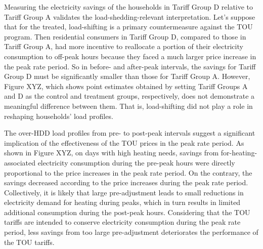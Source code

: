 Measuring the electricity savings of the households in Tariff Group D relative to Tariff Group A validates the load-shedding-relevant interpretation. Let's suppose that for the treated, load-shifting is a primary countermeasure against the TOU program. Then residential consumers in Tariff Group D, compared to those in Tariff Group A, had more incentive to reallocate a portion of their electricity consumption to off-peak hours because they faced a much larger price increase in the peak rate period. So in before- and after-peak intervals, the savings for Tariff Group D must be significantly smaller than those for Tariff Group A. However, Figure XYZ, which shows point estimates obtained by setting Tariff Groups A and D as the control and treatment groups, respectively, does not demonstrate a meaningful difference between them. That is, load-shifting did not play a role in reshaping households' load profiles. 

The over-HDD load profiles from pre- to post-peak intervals suggest a significant implication of the effectiveness of the TOU prices in the peak rate period. As shown in Figure XYZ, on days with high heating needs, savings from for-heating-associated electricity consumption during the pre-peak hours were directly proportional to the price increases in the peak rate period. On the contrary, the savings decreased according to the price increases during the peak rate period. Collectively, it is likely that large pre-adjustment leads to small reductions in electricity demand for heating during peaks, which in turn results in limited additional consumption during the post-peak hours. Considering that the TOU tariffs are intended to conserve electricity consumption during the peak rate period, less savings from too large pre-adjustment deteriorates the performance of the TOU tariffs. 

